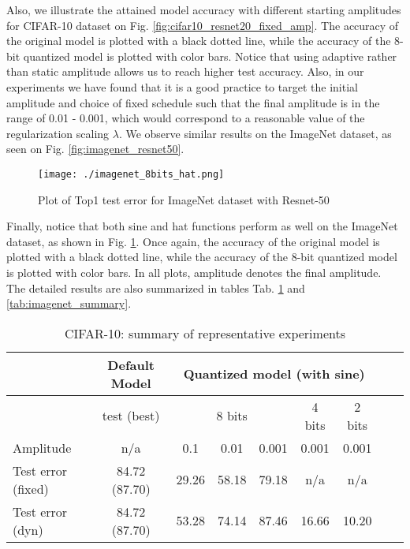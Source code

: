 \documentclass{article}
\newcommand{\squeeze}{\vspace{-2.5mm}}
\begin{document}
Also, we illustrate the attained model accuracy with different starting amplitudes for CIFAR-10 dataset on Fig. \ref{fig:cifar10_resnet20_fixed_amp}. The accuracy of the original model is plotted with a black dotted line, while the accuracy of the 8-bit quantized model is plotted with color bars. Notice that using adaptive rather than static amplitude allows us to reach higher test accuracy. Also, in our experiments we have found that it is a good practice to target the initial amplitude and choice of fixed schedule such that the final amplitude is in the range of 0.01 - 0.001, which would correspond to a reasonable value of the regularization scaling $\lambda$. We observe similar results on the ImageNet dataset, as seen on Fig. \ref{fig:imagenet_resnet50}. 

\begin{figure}[h]
 \begin{center}
  \texttt{[image: ./imagenet\_8bits\_hat.png]}
  \caption{Plot of Top1 test error for ImageNet dataset with Resnet-50}
  \label{fig:imagenet_hat_resnet50}
  \squeeze 
 \end{center}
\end{figure}

Finally, notice that both sine and hat functions perform as well on the ImageNet dataset, as shown in Fig. \ref{fig:imagenet_hat_resnet50}. Once again, the accuracy of the original model is plotted with a black dotted line, while the accuracy of the 8-bit quantized model is plotted with color bars. In all plots, amplitude denotes the final amplitude. The detailed results are also summarized in tables Tab. \ref{tab:cifar10_summary} and \ref{tab:imagenet_summary}.

\begin{table}[h]
\centering
\begin{tabular}{l|c|c|c|c|c|c|c|c}
   & Default Model & \multicolumn{5}{c|}{Quantized model (with sine)} \\
\hline             
           & test (best)   & \multicolumn{3}{c|}{8 bits}   & 4 bits & 2 bits \\
\hline
Amplitude  & n/a           & 0.1   & 0.01  & 0.001         & 0.001 & 0.001 \\
\hline
Test error (fixed) & 84.72 (87.70) & 29.26 & 58.18 & 79.18 & n/a   & n/a   \\
Test error (dyn)   & 84.72 (87.70) & 53.28 & 74.14 & 87.46 & 16.66 & 10.20 \\
\end{tabular}
\caption{CIFAR-10: summary of representative experiments}
\label{tab:cifar10_summary}
\squeeze 
\end{table}
\end{document}
